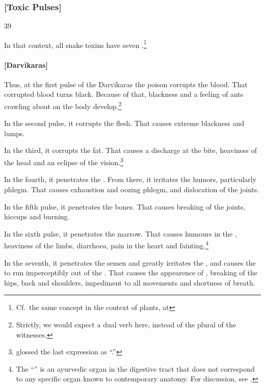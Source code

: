 \begin{translation}
\subsubsection{[Toxic Pulses]}

\item[39]

In that context, all snake toxins have seven .\footnote{Cf.\ the same concept in the context of plants, at 
\pageref{stagesofshock}}

\paragraph{[Darvīkaras]}   

Thus, at the first pulse of the Darvīkaras the poison corrupts the blood.
That corrupted blood turns black.  Because of that, blackness and a
feeling of ants crawling about on the body develop.\footnote{Strictly, we
    would expect a dual verb here, instead of the plural of the witnesses.}

In the second pulse, it corrupts the flesh.  That causes extreme blackness and  
lumps. 

In the third, it corrupts the fat. That causes a discharge at the bite,
heaviness of the head and an eclipse of the
vision.\footnote{ glossed the last expression as
    “.”}
    

In the fourth, it penetrates the .  From there, it 
irritates the humors, particularly phlegm. That causes exhaustion and oozing 
phlegm, and dislocation of the joints.

In the fifth pulse, it penetrates the bones.  That causes breaking of the joints, 
hiccups 
and burning.

In the sixth pulse, it penetrates the marrow.  That causes humours in the
, heaviness of the limbs, diarrhoea,
pain in the heart and fainting.\footnote{The “” is an ayurvedic organ in the digestive tract that does not
    correspond to any specific organ known to contemporary anatomy.  For
    discussion, see \cites[v.\,1,
    304]{josi-maha}[619]{meul-1974}[544--545]{das-2003}.}
    
In the seventh, it penetrates the semen and greatly irritates the
, and  causes the  to run
imperceptibly out of the .  That causes the appearence
of , breaking of the hips, back and shoulders, impediment 
to all movements and shortness of breath.
    

\end{translation}
